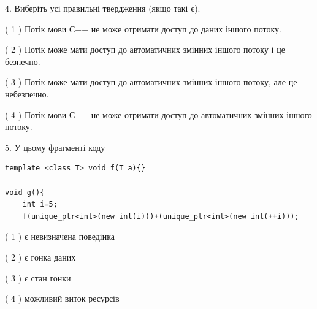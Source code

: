 \documentclass[12pt, ukrainian]{article}
\begin{document}
\begin {large}
{%
4. Виберіть усі правильні твердження (якщо такі є).\par
\vspace{2mm}

( 1 ) Потік мови С++ не може отримати доступ до даних іншого потоку.%

( 2 ) Потік може мати доступ до автоматичних змінних іншого потоку і це безпечно.%

( 3 ) Потік може мати доступ до автоматичних змінних іншого потоку, але це небезпечно.%

( 4 ) Потік мови С++ не може отримати доступ до автоматичних змінних іншого потоку.%


5. У цьому фрагменті коду
\begin{verbatim}
template <class T> void f(T a){}

void g(){
    int i=5;
    f(unique_ptr<int>(new int(i)))+(unique_ptr<int>(new int(++i)));
\end{verbatim}
( 1 ) є невизначена поведінка%

( 2 ) є гонка даних%

( 3 ) є стан гонки%

( 4 ) можливий виток ресурсів%
}
\end {large}
\end{document}
